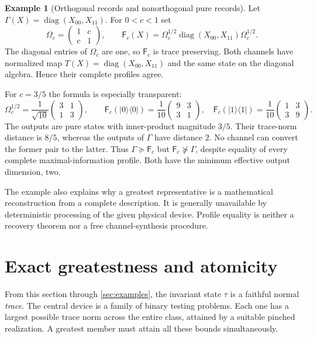 \documentclass[11pt,reqno]{amsart}
\theoremstyle{definition}
\newtheorem{example}[theorem]{Example}
\theoremstyle{remark}
\numberwithin{equation}{section}
\DeclareMathOperator{\diag}{diag}
\newcommand{\F}{\mathsf F}
\begin{document}
\begin{example}[Orthogonal records and nonorthogonal pure records]\label{ex:two-pure}
Let $\Gamma(X)=\diag(X_{00},X_{11})$. For $0<c<1$ set
\[
 \Omega_c=\begin{pmatrix}1&c\\c&1\end{pmatrix},\qquad
 \F_c(X)=\Omega_c^{1/2}\diag(X_{00},X_{11})\Omega_c^{1/2}.
\]
The diagonal entries of $\Omega_c$ are one, so $\F_c$ is trace preserving. Both channels have normalized map $T(X)=\diag(X_{00},X_{11})$ and the same state on the diagonal algebra. Hence their complete profiles agree.

For $c=3/5$ the formula is especially transparent:
\[
 \Omega_c^{1/2}=\frac1{\sqrt{10}}\begin{pmatrix}3&1\\1&3\end{pmatrix},\qquad
 \F_c(|0\rangle\langle0|)=\frac1{10}\begin{pmatrix}9&3\\3&1\end{pmatrix},\quad
 \F_c(|1\rangle\langle1|)=\frac1{10}\begin{pmatrix}1&3\\3&9\end{pmatrix}.
\]
The outputs are pure states with inner-product magnitude $3/5$. Their trace-norm distance is $8/5$, whereas the outputs of $\Gamma$ have distance $2$. No channel can convert the former pair to the latter. Thus $\Gamma\succeq\F_c$ but $\F_c\not\succeq\Gamma$, despite equality of every complete maximal-information profile. Both have the minimum effective output dimension, two.
\end{example}

The example also explains why a greatest representative is a mathematical reconstruction from a complete description. It is generally unavailable by deterministic processing of the given physical device. Profile equality is neither a recovery theorem nor a free channel-synthesis procedure.



\section{Exact greatestness and atomicity}\label{sec:exact}

From this section through \cref{sec:examples}, the invariant state $\tau$ is a faithful normal \emph{trace}. The central device is a family of binary testing problems. Each one has a largest possible trace norm across the entire class, attained by a suitable pinched realization. A greatest member must attain all these bounds simultaneously.
\end{document}
